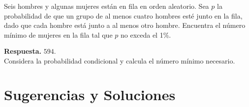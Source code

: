 \documentclass[11pt]{scrartcl}
\begin{document}
\begin{problem}[AIME 2011]
Seis hombres y algunas mujeres están en fila en orden aleatorio. Sea \( p \) la probabilidad de que un grupo de al menos cuatro hombres esté junto en la fila, dado que cada hombre está junto a al menos otro hombre. Encuentra el número mínimo de mujeres en la fila tal que \( p \) no exceda el 1\%.
\begin{hint}
\textbf{Respuesta.} \( 594 \).\\

Considera la probabilidad condicional y calcula el número mínimo necesario.
\end{hint}
\end{problem}


\section{Sugerencias y Soluciones}
\begin{enumerate}

\end{enumerate}
\end{document}
